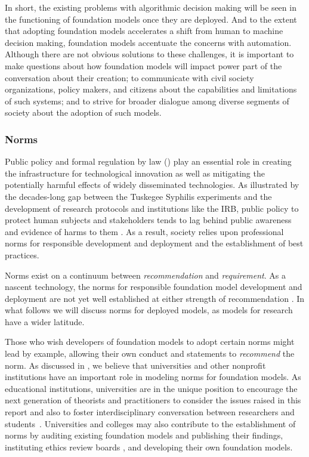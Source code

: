 In short, the existing problems with algorithmic decision making will be seen in the functioning of foundation models once they are deployed. And to the extent that adopting foundation models accelerates a shift from human to machine decision making, foundation models accentuate the concerns with automation. 
Although there are not obvious solutions to these challenges, it is important to make questions about how foundation models will impact power part of the conversation about their creation; to communicate with civil society organizations, policy makers, and citizens about the capabilities and limitations of such systems; and to strive for broader dialogue among diverse segments of society about the adoption of such models. 


\subsubsection{Norms} 

Public policy and formal regulation by law () play an essential role in creating the infrastructure for technological innovation as well as mitigating the potentially harmful effects of widely disseminated technologies. 
As illustrated by the decades-long gap between the Tuskegee Syphilis experiments and the development of research protocols and institutions like the IRB, public policy to protect human subjects and stakeholders tends to lag behind public awareness and evidence of harms to them \citep{Grady2015, stark_IRBs, belmont_report}. 
As a result, society relies upon professional norms for responsible development and deployment and the establishment of best practices.  

Norms exist on a continuum between \textit{recommendation} and \textit{requirement}. 
As a nascent technology, the norms for responsible foundation model development and deployment are not yet well established at either strength of recommendation \citep{lawfare_norms}. 
In what follows we will discuss norms for deployed models, as models for research have a wider latitude.

Those who wish developers of foundation models to adopt certain norms might lead by example, allowing their own conduct and statements to \textit{recommend} the norm. 
As discussed in  , we believe that universities and other nonprofit institutions have an important role in modeling norms for foundation models. 
As educational institutions, universities are in the unique position to encourage the next generation of theorists and practitioners to consider the issues raised in this report and also to foster interdisciplinary conversation between researchers and students~\citep{rogers2021}. 
Universities and colleges may also contribute to the establishment of norms by auditing existing foundation models and publishing their findings, instituting ethics review boards \citep{bernstein_esr_2021}, and developing their own foundation models. 

